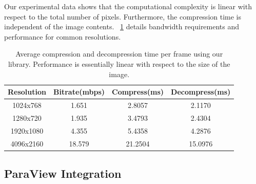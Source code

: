 \documentclass[review]{vgtc}                 %
\begin{document}

Our experimental data shows that the computational complexity is
linear with respect to the total number of pixels.  Furthermore, the
compression time is independent of the image contents.
~\cref{tab:experiment_setup} details bandwidth requirements and
performance for common resolutions.


%

\begin{table}[h]
  \caption{Average compression and decompression time per frame
  using our library.  Performance is essentially linear with
  respect to the size of the image.}
  \label{tab:experiment_setup}
  \scriptsize
  \begin{center}
    \begin{tabular}{cccc}
      Resolution & Bitrate(mbps) & Compress(ms) & Decompress(ms)\\
    \hline
      1024x768 & 1.651 & 2.8057 & 2.1170\\
      1280x720 & 1.935 & 3.4793 & 2.4304\\
      1920x1080 & 4.355 & 5.4358 & 4.2876\\
      4096x2160 & 18.579 & 21.2504 & 15.0976
    \end{tabular}
  \end{center}
\end{table}

\subsection{ParaView Integration}
\end{document}
